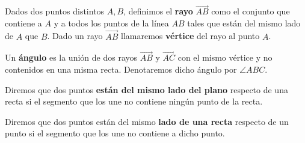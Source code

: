 \begin{defin*}
\end{defin*}



\begin{defin*}
\end{defin*}


\begin{defin*}[Triángulos]
\end{defin*}


\begin{defin*}[Rayos]
  Dados dos puntos distintos $A, B$, definimos el \textbf{rayo}
  $\overrightarrow{AB}$ como el conjunto que contiene a $A$ y a todos los puntos
  de la línea $AB$ tales que están del mismo lado de $A$ que $B$. Dado un rayo
  $\overrightarrow{AB}$ llamaremos \textbf{vértice} del rayo al punto $A$.
\end{defin*}


\begin{defin*}[Ángulos]
  Un \textbf{ángulo} es la unión de dos rayos $\overrightarrow{AB}$ y
  $\overrightarrow{AC}$ con el mismo vértice y no contenidos en una misma recta.
  Denotaremos dicho ángulo por $\angle ABC$.
\end{defin*}


\begin{defin*}
  Diremos que dos puntos \textbf{están del mismo lado del plano} respecto de una
  recta si el segmento que los une no contiene ningún punto de la recta.

  Diremos que dos puntos están del mismo \textbf{lado de una recta} respecto de
  un punto si el segmento que los une no contiene a dicho punto.
\end{defin*}


